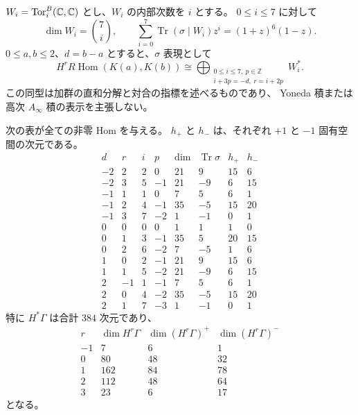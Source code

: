 \begin{proposition}
\label{cmo:prop:equivariant-window-hom}
$W_i=\operatorname{Tor}^B_i(\mathbb C,\mathbb C)$ とし、$W_i$ の内部次数を $i$ とする。
$0\le i\le7$ に対して
\begin{equation}\label{cmo:eq:koszul-involution-character}
 \dim W_i=\binom7i,\qquad
 \sum_{i=0}^7\operatorname{Tr}(\sigma\mid W_i)z^i
 =(1+z)^6(1-z).
\end{equation}
$0\le a,b\le2$、$d=b-a$ とすると、$\sigma$ 表現として
\begin{equation}\label{cmo:eq:stable-window-character}
 H^rR\operatorname{Hom}(K(a),K(b))
 \cong
 \bigoplus_{\substack{0\le i\le7,\ p\in\mathbb Z\\
                       i+3p=-d,\ r=i+2p}}W_i^*.
\end{equation}
この同型は加群の直和分解と対合の指標を述べるものであり、
Yoneda 積または高次 $A_\infty$ 積の表示を主張しない。

次の表が全ての非零 Hom を与える。
$h_+$ と $h_-$ は、それぞれ $+1$ と $-1$ 固有空間の次元である。
\begin{equation}\label{cmo:eq:window-hom-table}
\begin{array}{c|rrr|rrrr}
 d&r&i&p&\dim&\operatorname{Tr}\sigma&h_+&h_-\\\hline
 -2& 2&2& 0&21& 9&15& 6\\
 -2& 3&5&-1&21&-9& 6&15\\\hline
 -1& 1&1& 0& 7& 5& 6& 1\\
 -1& 2&4&-1&35&-5&15&20\\
 -1& 3&7&-2& 1&-1& 0& 1\\\hline
  0& 0&0& 0& 1& 1& 1& 0\\
  0& 1&3&-1&35& 5&20&15\\
  0& 2&6&-2& 7&-5& 1& 6\\\hline
  1& 0&2&-1&21& 9&15& 6\\
  1& 1&5&-2&21&-9& 6&15\\\hline
  2&-1&1&-1& 7& 5& 6& 1\\
  2& 0&4&-2&35&-5&15&20\\
  2& 1&7&-3& 1&-1& 0& 1
\end{array}
\end{equation}
特に $H^*\Gamma$ は合計 $384$ 次元であり、
\begin{equation}\label{cmo:eq:window-total-table}
\begin{array}{c|rrr}
 r&\dim H^r\Gamma&\dim(H^r\Gamma)^+&\dim(H^r\Gamma)^-\\\hline
 -1& 7& 6& 1\\
  0&80&48&32\\
  1&162&84&78\\
  2&112&48&64\\
  3&23&6&17
\end{array}
\end{equation}
となる。
\end{proposition}

